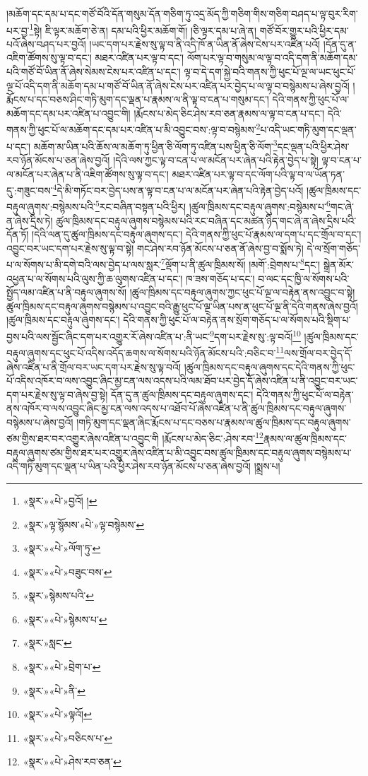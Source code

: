 །མཆོག་དང་དམ་པ་དང་གཙོ་བོའི་དོན་གསུམ་དོན་གཅིག་ཏུ་འདྲ་མོད་ཀྱི་གཅིག་གིས་གཅིག་བཤད་པ་ལྟ་བུར་རིག་པར་བྱ་\footnote{«སྣར་»«པེ་»བྱའོ། །}སྟེ། ཇི་ལྟར་མཆོག་ཅེ་ན། དམ་པའི་ཕྱིར་མཆོག་གོ། །ཅི་ལྟར་དམ་པ་ཞེ་ན། གཙོ་བོར་གྱུར་པའི་ཕྱིར་དམ་པའོ་ཞེས་བཤད་པར་བྱའོ། །ཡང་དག་པར་རྗེས་སུ་ལྟ་བ་ནི་འདི་ཁོ་ན་ཡིན་ནོ་ཞེས་ངེས་པར་འཛིན་པའོ། །དོན་དུ་ན་འཇིག་ཚོགས་སུ་ལྟ་བ་དང་། མཐར་འཛིན་པར་ལྟ་བ་དང་། ལོག་པར་ལྟ་བ་གསུམ་ལ་ལྟ་བ་འདི་དག་ནི་མཆོག་དམ་པའི་གཙོ་བོ་ཡིན་ནོ་ཞེས་སེམས་ངེས་པར་འཛིན་པ་དང་། ལྟ་བ་དེ་དག་སྐྱེ་བའི་གནས་ཀྱི་ཕུང་པོ་ལྔ་ལ་ཡང་ཕུང་པོ་ལྔ་པོ་འདི་དག་ནི་མཆོག་དམ་པ་གཙོ་བོ་ཡིན་ནོ་ཞེས་ངེས་པར་འཛིན་པར་བྱེད་པ་ལ་ལྟ་བ་བསྙེམས་པ་ཞེས་བྱའོ། །རྨོངས་པ་དང་བཅས་ཤིང་གཏི་མུག་དང་ལྡན་པ་རྣམས་ལ་ནི་ལྟ་བ་ངན་པ་གསུམ་དང་། དེའི་གནས་ཀྱི་ཕུང་པོ་ལ་མཆོག་དང་དམ་པར་འཛིན་པ་འབྱུང་གི། །རྨོངས་པ་མེད་ཅིང་ཤེས་རབ་ཅན་རྣམས་ལ་ལྟ་བ་ངན་པ་དང་། དེའི་གནས་ཀྱི་ཕུང་པོ་ལ་མཆོག་དང་དམ་པར་འཛིན་པ་མི་འབྱུང་བས་:ལྟ་བ་བསྙེམས་\footnote{«སྣར་»ལྟ་སྙོམས་«པེ་»ལྟ་བསྙེམས་}པ་འདི་ཡང་གཏི་མུག་དང་ལྡན་པ་དང་། མཆོག་མ་ཡིན་པའི་ཆོས་ལ་མཆོག་ཏུ་ཕྱིན་ཅི་ལོག་ཏུ་འཛིན་པས་ཕྱིན་ཅི་ལོག་\footnote{«སྣར་»«པེ་»ལོག་ཏུ་}དང་ལྡན་པའི་ཕྱིར་ཤེས་རབ་ཉོན་མོངས་པ་ཅན་ཞེས་བྱའོ། །དེའི་ལས་ཀྱང་ལྟ་བ་ངན་པ་ལ་མངོན་པར་ཞེན་པའི་རྟེན་བྱེད་པ་སྟེ། ལྟ་བ་ངན་པ་ལ་མངོན་པར་ཞེན་པ་ནི་འཇིག་ཚོགས་སུ་ལྟ་བ་དང་། མཐར་འཛིན་པར་ལྟ་བ་དང་ལོག་པའི་ལྟ་བ་ལ་ཡོན་ཏན་དུ་:གཟུང་བས་\footnote{«སྣར་»«པེ་»བཟུང་བས་}དེ་མི་གཏོང་བར་བྱེད་པས་ན་ལྟ་བ་ངན་པ་ལ་མངོན་པར་ཞེན་པའི་རྟེན་བྱེད་པའོ། །ཚུལ་ཁྲིམས་དང་བརྟུལ་ཞུགས་:བསྙེམས་པའི་\footnote{«སྣར་»སྙེམས་པའི་}རང་བཞིན་བསྟན་པའི་ཕྱིར། །ཚུལ་ཁྲིམས་དང་བརྟུལ་ཞུགས་:བསྙེམས་པ་\footnote{«སྣར་»«པེ་»སྙེམས་པ་}གང་ཞེ་ན་ཞེས་དྲིས་ཏེ། ཚུལ་ཁྲིམས་དང་བརྟུལ་ཞུགས་བསྙེམས་པའི་རང་བཞིན་དང་མཚན་ཉིད་གང་ཞེ་ན་ཞེས་དྲིས་པའི་དོན་ཏོ། །དེའི་ལན་དུ་ཚུལ་ཁྲིམས་དང་བརྟུལ་ཞུགས་དང་། དེའི་གནས་ཀྱི་ཕུང་པོ་རྣམས་ལ་དག་པ་དང་གྲོལ་བ་དང་། འབྱུང་བར་ཡང་དག་པར་རྗེས་སུ་ལྟ་བ་སྟེ། གང་ཤེས་རབ་ཉོན་མོངས་པ་ཅན་ནོ་ཞེས་བྱ་བ་སྨོས་ཏེ། དེ་ལ་སྲོག་གཅོད་པ་ལ་སོགས་པ་མི་དགེ་བའི་ལས་བྱེད་པ་ལས་སླར་\footnote{«སྣར་»སླང་}ལྡོག་པ་ནི་ཚུལ་ཁྲིམས་སོ། །མགོ་:བྲེགས་པ་\footnote{«སྣར་»«པེ་»བྲེག་པ་}དང་། སྒྲེན་མོར་འཕྱན་པ་ལ་སོགས་པའི་ལུས་ཀྱི་ཆ་ལུགས་འཛིན་པ་དང་། ཁ་ཟས་གཅོད་པ་དང་། བ་ལང་དང་ཁྱི་ལ་སོགས་པའི་སྤྱོད་ལམ་འཛིན་པ་ནི་བརྟུལ་ཞུགས་སོ། །ཚུལ་ཁྲིམས་དང་བརྟུལ་ཞུགས་ཀྱང་ཕུང་པོ་ལྔ་ལ་བརྟེན་ནས་འབྱུང་བ་སྟེ། ཚུལ་ཁྲིམས་དང་བརྟུལ་ཞུགས་བསྙེམས་པ་འབྱུང་བའི་རྒྱུ་ཕུང་པོ་ལྔ་ཡིན་པས་ན་ཕུང་པོ་ལྔ་ནི་དེའི་གནས་ཞེས་བྱའོ། །ཚུལ་ཁྲིམས་དང་བརྟུལ་ཞུགས་དང་། དེའི་གནས་ཀྱི་ཕུང་པོ་ལ་བརྟེན་ནས་སྲོག་གཅོད་པ་ལ་སོགས་པའི་སྡིག་པ་བྱས་པའི་ལས་སྦྱོང་ཞིང་དག་པར་འགྱུར་རོ་ཞེས་འཛིན་པ་:ནི་ཡང་\footnote{«སྣར་»«པེ་»ནི་}དག་པར་རྗེས་སུ་:ལྟ་བའོ།\footnote{«སྣར་»«པེ་»ལྟའོ།} །ཚུལ་ཁྲིམས་དང་བརྟུལ་ཞུགས་དང་ཕུང་པོ་འདིས་འདོད་ཆགས་ལ་སོགས་པའི་ཉོན་མོངས་པའི་:བཅིང་བ་\footnote{«སྣར་»«པེ་»བཅིངས་པ་}ལས་གྲོལ་བར་བྱེད་དོ་ཞེས་འཛིན་པ་ནི་གྲོལ་བར་ཡང་དག་པར་རྗེས་སུ་ལྟ་བའོ། །ཚུལ་ཁྲིམས་དང་བརྟུལ་ཞུགས་དང་དེའི་གནས་ཀྱི་ཕུང་པོ་འདིས་འཁོར་བ་ལས་འབྱུང་ཞིང་མྱ་ངན་ལས་འདས་པའི་ལམ་ཐོབ་པར་བྱེད་དོ་ཞེས་འཛིན་པ་ནི་འབྱུང་བར་ཡང་དག་པར་རྗེས་སུ་ལྟ་བ་ཞེས་བྱ་སྟེ། དོན་དུ་ན་ཚུལ་ཁྲིམས་དང་བརྟུལ་ཞུགས་དང་། དེའི་གནས་ཀྱི་ཕུང་པོ་ལ་བརྟེན་ནས་འཁོར་བ་ལས་འབྱུང་ཞིང་མྱ་ངན་ལས་འདས་པ་འཐོབ་པོ་ཞེས་འཛིན་པ་ནི་ཚུལ་ཁྲིམས་དང་བརྟུལ་ཞུགས་བསྙེམས་པ་ཞེས་བྱའོ། །གཏི་མུག་དང་ལྡན་ཞིང་རྨོངས་པ་དང་བཅས་པ་རྣམས་ལ་ཚུལ་ཁྲིམས་དང་བརྟུལ་ཞུགས་ཙམ་གྱིས་ཐར་བར་འགྱུར་ཞེས་འཛིན་པ་འབྱུང་གི །རྨོངས་པ་མེད་ཅིང་:ཤེས་རབ་\footnote{«སྣར་»«པེ་»ཤེས་རབ་ཅན་}རྣམས་ལ་ཚུལ་ཁྲིམས་དང་བརྟུལ་ཞུགས་ཙམ་གྱིས་ཐར་པར་འགྱུར་ཞེས་འཛིན་པ་མི་འབྱུང་བས་ཚུལ་ཁྲིམས་དང་བརྟུལ་ཞུགས་བསྙེམས་པ་འདི་གཏི་མུག་དང་ལྡན་པ་ཡིན་པའི་ཕྱིར་ཤེས་རབ་ཉོན་མོངས་པ་ཅན་ཞེས་བྱའོ། །སྨྲས་པ། 